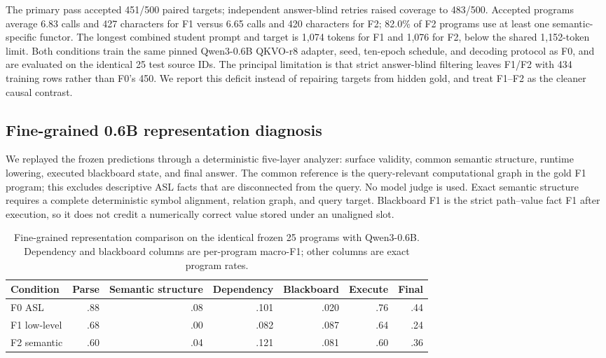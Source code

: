 \documentclass[11pt]{article}
\begin{document}
The primary pass accepted 451/500 paired targets; independent answer-blind
retries raised coverage to 483/500. Accepted programs average 6.83 calls and
427 characters for F1 versus 6.65 calls and 420 characters for F2; 82.0\% of
F2 programs use at least one semantic-specific functor. The longest combined
student prompt and target is 1,074 tokens for F1 and 1,076 for F2, below the
shared 1,152-token limit. Both conditions train the same pinned Qwen3-0.6B
QKVO-r8 adapter, seed, ten-epoch schedule, and decoding protocol as F0, and are
evaluated on the identical 25 test source IDs. The principal limitation is
that strict answer-blind filtering leaves F1/F2 with 434 training rows rather
than F0's 450. We report this deficit instead of repairing targets from hidden
gold, and treat F1--F2 as the cleaner causal contrast.

\subsection{Fine-grained 0.6B representation diagnosis}

We replayed the frozen predictions through a deterministic five-layer analyzer:
surface validity, common semantic structure, runtime lowering, executed
blackboard state, and final answer. The common reference is the query-relevant
computational graph in the gold F1 program; this excludes descriptive ASL facts
that are disconnected from the query. No model judge is used. Exact semantic
structure requires a complete deterministic symbol alignment, relation graph,
and query target. Blackboard F1 is the strict path--value fact F1 after execution,
so it does not credit a numerically correct value stored under an unaligned slot.

\begin{table}[t]
\centering\small
\caption{Fine-grained representation comparison on the identical frozen 25
programs with Qwen3-0.6B. Dependency and blackboard columns are per-program
macro-F1; other columns are exact program rates.}
\label{tab:functor-diagnostics}
\begin{tabular}{lrrrrrr}
\toprule
Condition & Parse & Semantic structure & Dependency & Blackboard & Execute & Final\\
\midrule
F0 ASL             & .88 & .08 & .101 & .020 & .76 & .44\\
F1 low-level       & .68 & .00 & .082 & .087 & .64 & .24\\
F2 semantic        & .60 & .04 & .121 & .081 & .60 & .36\\
\bottomrule
\end{tabular}
\end{table}
\end{document}
